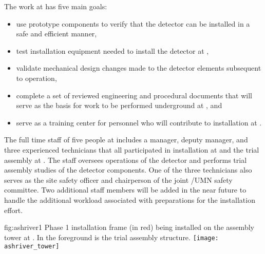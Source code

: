 The work at  has five main goals:
\begin{itemize}
  \item use prototype  components to verify that the
    detector can be installed in a safe and efficient
    manner,
    \item test installation equipment needed to install the
       detector at ,
  \item validate mechanical design changes made to the detector
    elements subsequent to  operation,
  \item complete a set of reviewed engineering and procedural
    documents that will serve as the basis for work to be performed
    underground at , and
  \item serve as a training center for personnel who will 
    contribute to   installation at .
\end{itemize}

The full time staff of five people at 
includes a manager, deputy manager, and three experienced technicians
that all participated in  installation at  and
the  trial assembly at .  The staff
oversees operations of the  detector and performs trial
assembly studies of the  detector components.  One of the
three technicians also serves as the site safety officer and
chairperson of the joint /UMN safety committee.  Two additional staff
members will be added in the near future to handle the additional
workload associated with preparations for the 
installation effort.
\begin{dunefigure}
  {fig:ashriver1}
  {Phase 1  installation frame (in red) being installed on the
   assembly tower at . In the foreground is
  the  trial assembly structure.}
   \texttt{[image: ashriver\_tower]}
\end{dunefigure}

